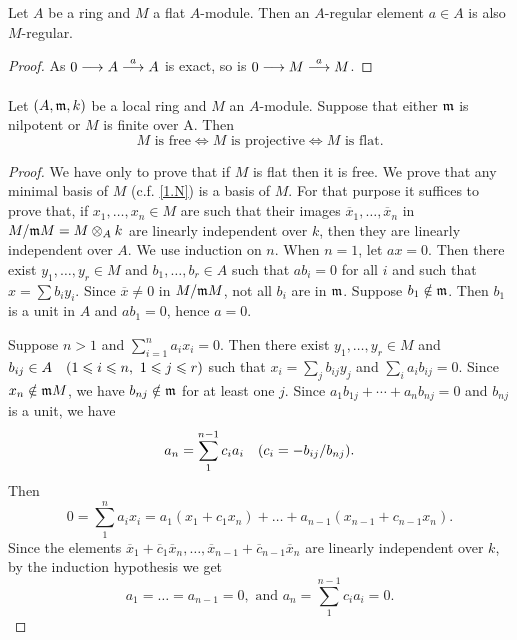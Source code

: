 \documentclass[../main]{subfiles}
\begin{document}
\newparagraph Let $A$ be a ring and $M$ a flat $A$-module. Then an $A$-regular element $a \in A$ is also $M$-regular.
\begin{proof} 
    As $0 \varrightarrow{} A \varrightarrow{a} A$ is exact, so is $0 \varrightarrow{} M \varrightarrow{a} M$.
\end{proof}


\begin{parproposition}\label{pro:3.G}
    Let $(A, \mathfrak{m}, k )$ be a local ring and $M$ an $A$-module. Suppose that either $\mathfrak{m}$ is nilpotent or $M$ is finite over A. Then
    \[
        M \text{ is free} \iff M \text{ is projective} \iff M \text{ is flat.}
    \]
\end{parproposition}

\begin{proof} 
    We have only to prove that if $M$ is flat then it is free. We prove that any minimal basis of $M$ (c.f. \ref{1.N}) is a basis of $M$. For that purpose it suffices to prove that, if $x_1,\ldots,x_n \in M$ are such that their images $\overline{x}_1,\ldots,\overline{x}_n$ in $M/\mathfrak{m}M = M \otimes_A k$ are linearly independent over $k$, then they are linearly independent over $A$. We use induction on $n$. When $n=1$, let $ax=0$. Then there exist $y_1,\ldots,y_r\in M$ and $b_1,\ldots,b_r\in A$ such that $ab_i=0$ for all $i$ and such that $x = \sum b_iy_i$. Since $\overline{x} \neq 0$ in $M/\mathfrak{m}M$, not all $b_i$ are in $\mathfrak{m}$. Suppose $b_1 \notin \mathfrak{m}$. Then $b_1$ is a unit in $A$ and $ab_1=0$, hence $a=0$.
    
    Suppose $n>1$ and $\sum_{i=1}^n a_ix_i=0.$ Then there exist $y_1,\ldots,y_r \in M$ and\newline $b_{ij}\in A\for{1\le i\le n,\ 1 \le j \le r}$ such that $x_i = \sum_j b_{ij}y_j$ and $\sum_i a_ib_{ij}=0$. Since $x_n \notin \mathfrak{m}M$, we have $b_{nj}\notin\mathfrak{m}$ for at least one $j$. Since $a_1b_{1j}+\cdots+a_nb_{nj}=0$ and $b_{nj}$ is a unit, we have
    \[
        a_n = \sum_1^{n-1} c_ia_i \for{c_i = -b_{ij}/b_{nj}}.
    \] 
    Then 
    \[
        0 = \sum_1^n a_ix_i = a_1(x_1+c_1x_n) + \ldots + a_{n-1} (x_{n-1} + c_{n-1}x_n).
    \] 
    Since the elements $\overline{x}_1 + \overline{c}_1\overline{x}_n,\ldots ,\overline{x}_{n-1}+\overline{c}_{n-1}\overline{x}_n$ are linearly independent over $k$, by the induction hypothesis we get 
    \[
        a_1 = \ldots = a_{n-1} = 0, \text{ and } a_n = \sum_1^{n-1} c_ia_i=0. 
    \] 
\end{proof}
\end{document}
